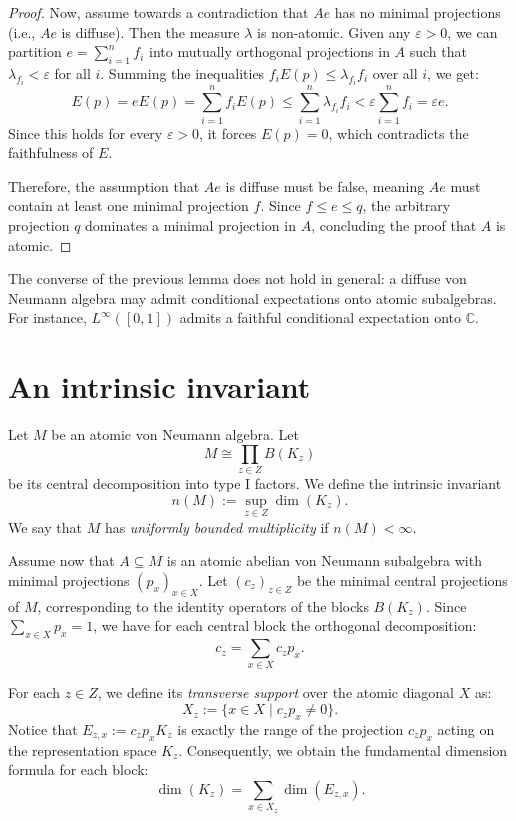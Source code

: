 \begin{proof}
Now, assume towards a contradiction that $Ae$ has no minimal projections (i.e., $Ae$ is diffuse). Then the measure $\lambda$ is non-atomic. Given any $\varepsilon > 0$, we can partition $e = \sum_{i=1}^n f_i$ into mutually orthogonal projections in $A$ such that $\lambda_{f_i} < \varepsilon$ for all $i$.
Summing the inequalities $f_i E(p) \leq \lambda_{f_i} f_i$ over all $i$, we get:
\[
E(p) = e E(p) = \sum_{i=1}^n f_i E(p) \leq \sum_{i=1}^n \lambda_{f_i} f_i < \varepsilon \sum_{i=1}^n f_i = \varepsilon e.
\]
Since this holds for every $\varepsilon > 0$, it forces $E(p) = 0$, which contradicts the faithfulness of $E$.

Therefore, the assumption that $Ae$ is diffuse must be false, meaning $Ae$ must contain at least one minimal projection $f$. Since $f \leq e \leq q$, the arbitrary projection $q$ dominates a minimal projection in $A$, concluding the proof that $A$ is atomic.
\end{proof}


\begin{remark}
The converse of the previous lemma does not hold in general: a diffuse von Neumann algebra may admit conditional expectations onto atomic subalgebras. For instance, $L^\infty([0,1])$ admits a faithful conditional expectation onto $\mathbb{C}$.
\end{remark}

\section{An intrinsic invariant}

\begin{definition}
Let $M$ be an atomic von Neumann algebra. Let
\[
M \cong \prod_{z \in Z} B(K_z)
\]
be its central decomposition into type I factors. We define the intrinsic invariant
\[
n(M) := \sup_{z \in Z} \dim(K_z).
\]
We say that $M$ has \emph{uniformly bounded multiplicity} if $n(M) < \infty$.
\end{definition}

Assume now that $A \subseteq M$ is an atomic abelian von Neumann subalgebra with minimal projections $(p_x)_{x \in X}$. 
Let $(c_z)_{z \in Z}$ be the minimal central projections of $M$, corresponding to the identity operators of the blocks $B(K_z)$. Since $\sum_{x \in X} p_x = 1$, we have for each central block the orthogonal decomposition:
\[
c_z = \sum_{x \in X} c_z p_x.
\]

For each $z \in Z$, we define its \emph{transverse support} over the atomic diagonal $X$ as:
\[
X_z := \{ x \in X \mid c_z p_x \neq 0 \}.
\]
Notice that $E_{z,x} := c_z p_x K_z$ is exactly the range of the projection $c_z p_x$ acting on the representation space $K_z$. Consequently, we obtain the fundamental dimension formula for each block:
\begin{equation}\label{eq:dimension_formula}
\dim(K_z) = \sum_{x \in X_z} \dim(E_{z,x}).
\end{equation}

